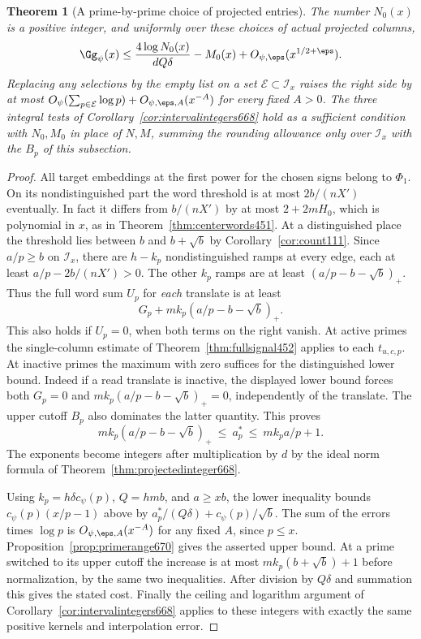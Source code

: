 \documentclass[a4paper,11pt]{article}
\newtheorem{theorem}[proposition]{Theorem}
\theoremstyle{definition}
\theoremstyle{remark}
\numberwithin{equation}{section}
\begin{document}
\begin{theorem}[A prime-by-prime choice of projected entries]
\leavevmode\label{thm:primeprojections670}
The number \(N_0(x)\) is a positive integer, and uniformly over
these choices of actual projected columns,
\[
 \Gg_\psi(x)\le\frac{4\log N_0(x)}{dQ\delta}-M_0(x)
                        +O_{\psi,\eps}(x^{1/2+\eps}).
\]
Replacing any selections by the empty list on a set
\(\mathcal E\subset\mathcal I_x\) raises the right side by at most
\(O_\psi(\sum_{p\in\mathcal E}\log p)+O_{\psi,\eps,A}(x^{-A})\)
for every fixed \(A>0\). The three integral tests of
Corollary~\ref{cor:intervalintegers668} hold as a sufficient
condition with \(N_0,M_0\) in place of \(N,M\), summing the
rounding allowance only over \(\mathcal I_x\) with the \(B_p\)
of this subsection.
\end{theorem}
\begin{proof}
All target embeddings at the first power for the chosen signs
belong to \(\Phi_1\). On its nondistinguished part the word
threshold is at most \(2b/(nX')\) eventually. In fact it differs
from \(b/(nX')\) by at most \(2+2mH_0\), which is polynomial in
\(x\), as in Theorem~\ref{thm:centerwords451}.
At a distinguished place the threshold lies between \(b\) and
\(b+\sqrt b\) by Corollary~\ref{cor:count111}.
Since \(a/p\ge b\) on \(\mathcal I_x\), there are \(h-k_p\)
nondistinguished ramps at every edge, each at least
\(a/p-2b/(nX')>0\). The other \(k_p\) ramps are at least
\((a/p-b-\sqrt b)_+\). Thus the full word sum \(U_p\) for
\emph{each} translate is at least
\[
 G_p+m k_p(a/p-b-\sqrt b)_+ .
\]
This also holds if \(U_p=0\), when both terms on the right
vanish. At active primes the single-column estimate of
Theorem~\ref{thm:fullsignal452} applies to each \(t_{u,c,p}\).
At inactive primes the maximum with zero suffices for the
distinguished lower bound. Indeed if a read translate is inactive,
the displayed lower bound forces both \(G_p=0\) and
\(m k_p(a/p-b-\sqrt b)_+=0\), independently of the translate.
The upper cutoff \(B_p\) also dominates the latter quantity.
This proves
\[
        m k_p(a/p-b-\sqrt b)_+\ \le\ a_p^*
                  \ \le\ m k_p a/p+1 .
\]
The exponents become integers after multiplication by \(d\) by
the ideal norm formula of Theorem~\ref{thm:projectedinteger668}.

Using \(k_p=h\delta c_\psi(p)\), \(Q=hmb\), and \(a\ge xb\),
the lower inequality bounds \(c_\psi(p)(x/p-1)\) above by
\(a_p^*/(Q\delta)+c_\psi(p)/\sqrt b\). The sum of the errors
times \(\log p\) is \(O_{\psi,\eps,A}(x^{-A})\) for any fixed
\(A\), since \(p\le x\). Proposition~\ref{prop:primerange670}
gives the asserted upper bound. At a prime switched to its
upper cutoff the increase is at most \(m k_p(b+\sqrt b)+1\)
before normalization, by the same two inequalities. After
division by \(Q\delta\) and summation this gives the stated cost.
Finally the ceiling and logarithm argument of
Corollary~\ref{cor:intervalintegers668} applies to these integers
with exactly the same positive kernels and interpolation error.
\end{proof}
\end{document}
